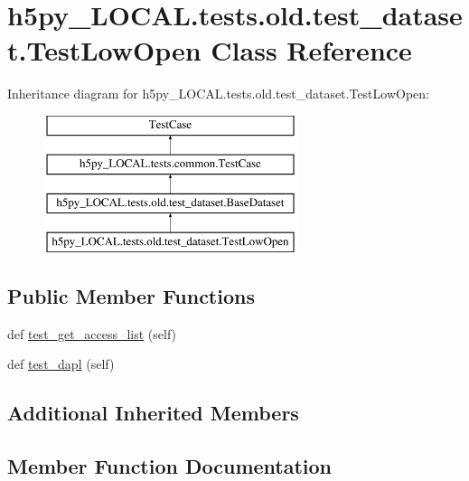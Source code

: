 \hypertarget{classh5py__LOCAL_1_1tests_1_1old_1_1test__dataset_1_1TestLowOpen}{}\section{h5py\+\_\+\+L\+O\+C\+A\+L.\+tests.\+old.\+test\+\_\+dataset.\+Test\+Low\+Open Class Reference}
\label{classh5py__LOCAL_1_1tests_1_1old_1_1test__dataset_1_1TestLowOpen}
Inheritance diagram for h5py\+\_\+\+L\+O\+C\+A\+L.\+tests.\+old.\+test\+\_\+dataset.\+Test\+Low\+Open\+:\begin{figure}[H]
\begin{center}
\leavevmode
\includegraphics[height=4.000000cm]{classh5py__LOCAL_1_1tests_1_1old_1_1test__dataset_1_1TestLowOpen}
\end{center}
\end{figure}
\subsection*{Public Member Functions}
\begin{DoxyCompactItemize}
\item 
def \hyperlink{classh5py__LOCAL_1_1tests_1_1old_1_1test__dataset_1_1TestLowOpen_a204f82c46e58d43bd46196ceb85d5798}{test\+\_\+get\+\_\+access\+\_\+list} (self)
\item 
def \hyperlink{classh5py__LOCAL_1_1tests_1_1old_1_1test__dataset_1_1TestLowOpen_a98fd501e58f97f44371c1ee60472d48d}{test\+\_\+dapl} (self)
\end{DoxyCompactItemize}
\subsection*{Additional Inherited Members}


\subsection{Member Function Documentation}
\mbox{\label{classh5py__LOCAL_1_1tests_1_1old_1_1test__dataset_1_1TestLowOpen_a98fd501e58f97f44371c1ee60472d48d}} 
